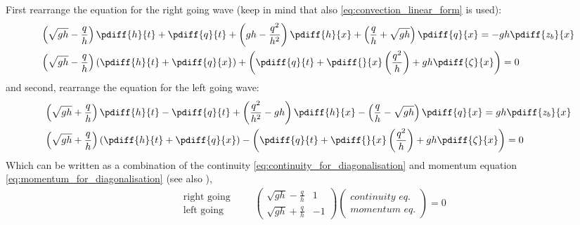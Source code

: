 First rearrange the equation for the right going wave (keep in mind that also \autoref{eq:convection_linear_form} is used):
\begin{align}
    &\left(\sqrt{gh} - \frac{q}{h}\right)\pdiff{h}{t} + \pdiff{q}{t} + 
     \left( gh - \frac{q^2}{h^2} \right)\pdiff{h}{x} + \left( \frac{q}{h} + \sqrt{gh}\right) \pdiff{q}{x} = -gh\pdiff{z_b}{x}
     \\*
 &\left(\sqrt{gh} - \frac{q}{h}\right)\left(\pdiff{h}{t} + \pdiff{q}{x}\right) + \left( \pdiff{q}{t} + \pdiff{}{x} \left( \frac{q^2}{h} \right) + 
 gh\pdiff{\zeta}{x}\right)   = 0
\end{align}
and second, rearrange the equation for the left going wave:
\begin{align}
    &\left(\sqrt{gh} + \frac{q}{h}\right)\pdiff{h}{t} - \pdiff{q}{t} +  \left( \frac{q^2}{h^2} - gh\right)\pdiff{h}{x} - \left( \frac{q}{h} - \sqrt{gh}\right)\pdiff{q}{x} = gh \pdiff{z_b}{x} 
     \\*
    &\left(\sqrt{gh} + \frac{q}{h}\right)\left(\pdiff{h}{t} + \pdiff{q}{x}\right)  - \left( \pdiff{q}{t} + \pdiff{}{x} \left( \frac{q^2}{h} \right) + gh \pdiff{\zeta}{x} \right) = 0
\end{align}
Which can be written as a combination of the continuity \eqref{eq:continuity_for_diagonalisation} and momentum equation \eqref{eq:momentum_for_diagonalisation} (see also \citet[eq.\ 4]{Borsboom2001}), 
\begin{align}
    \begin{matrix}
    \quad \text{right going} \\
    \quad \text{left going}
\end{matrix}
\qquad
    \begin{pmatrix}
        \sqrt{gh} - \frac{q}{h}  &  1 \\
        \sqrt{gh} + \frac{q}{h}  &  -1
    \end{pmatrix}
    \begin{pmatrix} \textit{continuity eq.} \\ \textit{momentum eq.} \end{pmatrix}    = 0
\end{align}
